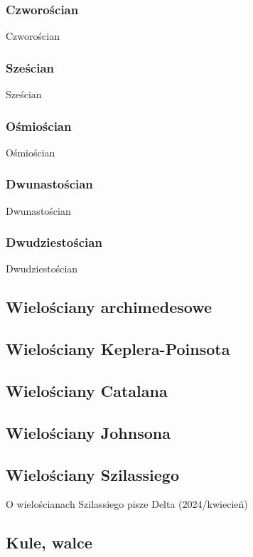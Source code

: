 \subsubsection{Czworościan}
Czworościan

\subsubsection{Sześcian}
Sześcian

\subsubsection{Ośmiościan}
Ośmiościan

\subsubsection{Dwunastościan}
Dwunastościan

\subsubsection{Dwudziestościan}
Dwudziestościan


\subsection{Wielościany archimedesowe}

\subsection{Wielościany Keplera-Poinsota}


\subsection{Wielościany Catalana}


\subsection{Wielościany Johnsona}


\subsection{Wielościany Szilassiego}
O wielościanach Szilassiego pisze Delta (2024/kwiecień)


\subsection{Kule, walce}
